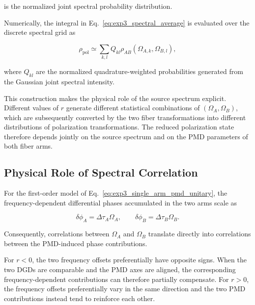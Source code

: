 is the normalized joint spectral probability distribution.

Numerically, the integral in Eq.~\eqref{eq:exp3_spectral_average} is evaluated
over the discrete spectral grid as

\begin{equation}
\rho_{\mathrm{pol}}
\simeq
\sum_{k,l}
Q_{kl}
\rho_{AB}
\left(
\Omega_{A,k},
\Omega_{B,l}
\right),
\label{eq:exp3_discrete_spectral_trace}
\end{equation}

where \(Q_{kl}\) are the normalized quadrature-weighted probabilities generated
from the Gaussian joint spectral intensity.

This construction makes the physical role of the source spectrum explicit.
Different values of \(r\) generate different statistical combinations of
\((\Omega_A,\Omega_B)\), which are subsequently converted by the two fiber
transformations into different distributions of polarization transformations.
The reduced polarization state therefore depends jointly on the source spectrum
and on the PMD parameters of both fiber arms.



\subsection{Physical Role of Spectral Correlation}

For the first-order model of Eq.~\eqref{eq:exp3_single_arm_pmd_unitary}, the
frequency-dependent differential phases accumulated in the two arms scale as

\begin{equation}
\delta\phi_A
=
\Delta\tau_A\Omega_A,
\qquad
\delta\phi_B
=
\Delta\tau_B\Omega_B.
\label{eq:exp3_two_arm_pmd_phases}
\end{equation}

Consequently, correlations between \(\Omega_A\) and \(\Omega_B\) translate
directly into correlations between the PMD-induced phase contributions.

For \(r<0\), the two frequency offsets preferentially have opposite signs.
When the two DGDs are comparable and the PMD axes are aligned, the corresponding
frequency-dependent contributions can therefore partially compensate. For
\(r>0\), the frequency offsets preferentially vary in the same direction and the
two PMD contributions instead tend to reinforce each other.


